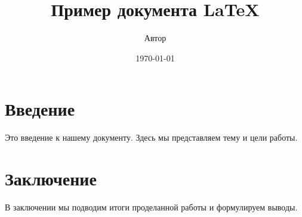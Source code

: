 \documentclass{article}
\title{Пример документа LaTeX}
\author{Автор}
\date{\today}
\begin{document}
\maketitle

\section{Введение}
Это введение к нашему документу. Здесь мы представляем тему и цели работы.

\section{Заключение}
В заключении мы подводим итоги проделанной работы и формулируем выводы.
\end{document}
